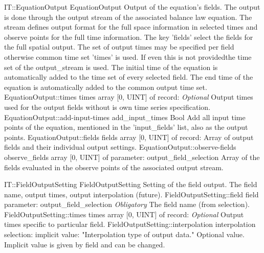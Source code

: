 \begin{RecordType}
	{IT::EquationOutput}
	{EquationOutput}
	{}%
	{}%
	{{{Output of the equation's fields.
The output is done through the output stream of the associated balance law equation.
The stream defines output format for the full space information in selected times and observe points for the full time information.
The key 'fields' select the fields for the full spatial output.
The set of output times may be specified  per field otherwise common time set 'times' is used.
If even this is not providedthe time set of the output{\_}stream is used.
The initial time of the equation is automatically added to the time set of every selected field.
The end time of the equation is automatically added to the common output time set.}%
}}
		\RecKey
			{EquationOutput::times}
			{times}
			{{array [0, UINT] of }{record: }}{}
			{ \it{Optional}}
			{{{Output times used for the output fields without is own time series specification.}%
}}
		\RecKey
			{EquationOutput::add-input-times}
			{add{\_}input{\_}times}
			{{Bool}}{}
			{ }
			{{{Add all input time points of the equation, mentioned in the 'input{\_}fields' list, also as the output points.}%
}}
		\RecKey
			{EquationOutput::fields}
			{fields}
			{{array [0, UINT] of }{record: }}{}
			{ \ValueDefault{[]}}
			{{{Array of output fields and their individual output settings.}%
}}
		\RecKey
			{EquationOutput::observe-fields}
			{observe{\_}fields}
			{{array [0, UINT] of }{parameter: output{\_}field{\_}selection}}{}
			{ \ValueDefault{[]}}
			{{{Array of the fields evaluated in the observe points of the associated output stream.}%
}}
\end{RecordType}
\begin{RecordType}
	{IT::FieldOutputSetting}
	{FieldOutputSetting}
	{}%
	{}%
	{{{Setting of the field output.
The field name, output times, output interpolation (future).}%
}}
		\RecKey
			{FieldOutputSetting::field}
			{field}
			{{parameter: output{\_}field{\_}selection}}{}
			{ \it{Obligatory}}
			{{{The field name (from selection).}%
}}
		\RecKey
			{FieldOutputSetting::times}
			{times}
			{{array [0, UINT] of }{record: }}{}
			{ \it{Optional}}
			{{{Output times specific to particular field.}%
}}
		\RecKey
			{FieldOutputSetting::interpolation}
			{interpolation}
			{{selection: }}{}
			{implicit value: "{Interpolation type of output data.}"}
			{{{Optional value.
Implicit value is given by field and can be changed.}%
}}
\end{RecordType}
